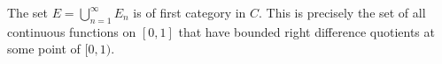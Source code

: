 The set $E = \bigcup_{n=1}^{\infty} E_n$ is of first category in $C$. This is precisely the set of all continuous functions on $[0,1]$ that have bounded right difference quotients at some point of $[0,1)$.
